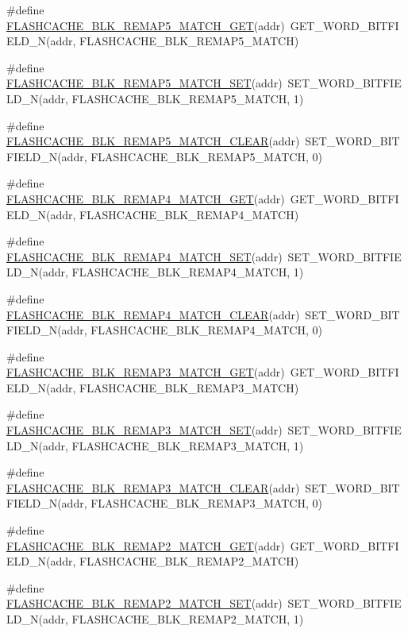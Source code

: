 \begin{DoxyCompactItemize}
\item 
\#define \hyperlink{a00549_a57a3a25e7d5ceca443661bdb85e9d320}{FLASHCACHE\_\-BLK\_\-REMAP5\_\-MATCH\_\-GET}(addr)~GET\_\-WORD\_\-BITFIELD\_\-N(addr, FLASHCACHE\_\-BLK\_\-REMAP5\_\-MATCH)
\item 
\#define \hyperlink{a00549_ae4442fac0ea3f9b4f6b98ed0a56a93f5}{FLASHCACHE\_\-BLK\_\-REMAP5\_\-MATCH\_\-SET}(addr)~SET\_\-WORD\_\-BITFIELD\_\-N(addr, FLASHCACHE\_\-BLK\_\-REMAP5\_\-MATCH, 1)
\item 
\#define \hyperlink{a00549_abf62f4c8102bc2520a5fbad00c02ba1d}{FLASHCACHE\_\-BLK\_\-REMAP5\_\-MATCH\_\-CLEAR}(addr)~SET\_\-WORD\_\-BITFIELD\_\-N(addr, FLASHCACHE\_\-BLK\_\-REMAP5\_\-MATCH, 0)
\item 
\#define \hyperlink{a00549_a0778446c6248446fe3cce3aa8ed5a47a}{FLASHCACHE\_\-BLK\_\-REMAP4\_\-MATCH\_\-GET}(addr)~GET\_\-WORD\_\-BITFIELD\_\-N(addr, FLASHCACHE\_\-BLK\_\-REMAP4\_\-MATCH)
\item 
\#define \hyperlink{a00549_a4ceda0c28b0fcf83147078626a13b3f1}{FLASHCACHE\_\-BLK\_\-REMAP4\_\-MATCH\_\-SET}(addr)~SET\_\-WORD\_\-BITFIELD\_\-N(addr, FLASHCACHE\_\-BLK\_\-REMAP4\_\-MATCH, 1)
\item 
\#define \hyperlink{a00549_a1d5d0601f3c7aac63179e744ce84c96c}{FLASHCACHE\_\-BLK\_\-REMAP4\_\-MATCH\_\-CLEAR}(addr)~SET\_\-WORD\_\-BITFIELD\_\-N(addr, FLASHCACHE\_\-BLK\_\-REMAP4\_\-MATCH, 0)
\item 
\#define \hyperlink{a00549_ac1ebc893214537f35c6ca5836c57e481}{FLASHCACHE\_\-BLK\_\-REMAP3\_\-MATCH\_\-GET}(addr)~GET\_\-WORD\_\-BITFIELD\_\-N(addr, FLASHCACHE\_\-BLK\_\-REMAP3\_\-MATCH)
\item 
\#define \hyperlink{a00549_aca7fcc74b604c7f23ea8f0c975589f87}{FLASHCACHE\_\-BLK\_\-REMAP3\_\-MATCH\_\-SET}(addr)~SET\_\-WORD\_\-BITFIELD\_\-N(addr, FLASHCACHE\_\-BLK\_\-REMAP3\_\-MATCH, 1)
\item 
\#define \hyperlink{a00549_a32e744ede08892be704d0a0fbcc2e558}{FLASHCACHE\_\-BLK\_\-REMAP3\_\-MATCH\_\-CLEAR}(addr)~SET\_\-WORD\_\-BITFIELD\_\-N(addr, FLASHCACHE\_\-BLK\_\-REMAP3\_\-MATCH, 0)
\item 
\#define \hyperlink{a00549_ade45a84d7e84820ab6e1a03167becca4}{FLASHCACHE\_\-BLK\_\-REMAP2\_\-MATCH\_\-GET}(addr)~GET\_\-WORD\_\-BITFIELD\_\-N(addr, FLASHCACHE\_\-BLK\_\-REMAP2\_\-MATCH)
\item 
\#define \hyperlink{a00549_aed7f132b6b963fbbef6fce94f723a5ee}{FLASHCACHE\_\-BLK\_\-REMAP2\_\-MATCH\_\-SET}(addr)~SET\_\-WORD\_\-BITFIELD\_\-N(addr, FLASHCACHE\_\-BLK\_\-REMAP2\_\-MATCH, 1)
\item 

\end{DoxyCompactItemize}
